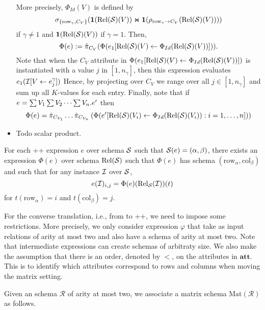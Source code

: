 \begin{itemize}
	More precisely, $\Phi_{Id}(V)$ is  defined by
	$$
	\sigma_{\{\mathrm{row}_\gamma,C_V\}}(\mathbf{1}(\text{Rel}(\mathcal{S})(V)) \Join \mathbf{1}(\rho_{\mathrm{row}_\gamma \to C_V}(\text{Rel}(\mathcal{S})(V))))$$
	if $\gamma \neq 1$ and
   $\mathbf{1}(\text{Rel}(\mathcal{S})(V))$ if $\gamma = 1$.
   Then,
	$$
	\Phi(e):=\hat{\pi}_{C_V}(\Phi(e_1[\text{Rel}(\mathcal{S})(V)\gets \Phi_{Id}(\text{Rel}(\mathcal{S})(V))])).
	$$
	Note that when the $C_{V}$ attribute in $\Phi(e_1[\text{Rel}(\mathcal{S})(V)\gets \Phi_{Id}(\text{Rel}(\mathcal{S})(V))])$
	is instantiated with a value $j$ in $[1,n_\gamma]$, then this expression evaluates $e_1(\mathcal{I}[V\gets e_j^\gamma])$
	Hence, by projecting over $C_V$ we range over all $j\in[1,n_\gamma]$ and sum up all $K$-values for each entry. 
	Finally, note that if $e=\textstyle\sum V_1 \textstyle\sum V_2 \cdots \textstyle\sum V_n. e'$ then$$\Phi(e)=\hat{\pi}_{C_{V_1}} \ldots \hat{\pi}_{C_{V_n}}\left( \Phi(e'[\text{Rel}(\mathcal{S})(V_i)\gets \Phi_{Id}(\text{Rel}(\mathcal{S})(V_i)):i=1,\ldots, n])\right)$$ 
	\item Todo scalar product.
\end{itemize}

\begin{proposition}
	For each \lang++ expression $e$ over schema $\mathcal{S}$ such that $\mathcal{S}(e)=(\alpha,\beta)$, there exists an \ARA expression $\Phi(e)$ over schema $\text{Rel}(\mathcal{S})$ such that $\Phi(e)$ has schema $(\mathrm{row}_\alpha,\mathrm{col}_\beta)$ and 
	such that for any instance $\mathcal{I}$ over $\mathcal{S}$,
	$$
	e(\mathcal{I})_{i,j}=\Phi(e)(\text{Rel}_{\mathcal{S}}(\mathcal{I}))(t)
	$$
	for $t(\mathrm{row}_\alpha)=i$ and $t(\mathrm{col}_\beta)=j$.
\end{proposition}

For the converse translation, i.e., from \ARA to \lang++, we need to impose some restrictions. More precisely, we only consider \ARA expression $\varphi$
that take as input relations of arity at most two and also have a schema of arity at most two. Note that intermediate expressions can create schemas of arbitraty size. We also make the assumption that there is an order, denoted by $<$, on the attributes in $\mathbf{att}$. This is to identify which attributes correspond to rows and columns when moving the matrix setting.


Given an \ARA schema $\mathcal{R}$ of arity at most two, we associate a matrix schema $\text{Mat}(\mathcal{R})$ as follows.

